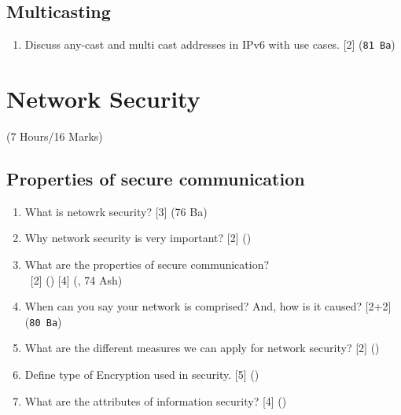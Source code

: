 \documentclass[12pt]{article}
\newcommand{\enter}{\\\textcolor{white}{1}}
\begin{document}
	\subsection{Multicasting}
		\begin{enumerate}[noitemsep, topsep=0pt]
			\item Discuss any-cast and multi cast addresses in IPv6 with use cases. \hfill [2] (\texttt{81 Ba})
		\end{enumerate}

	\pagebreak

\section{Network Security}
	\begin{center}(7 Hours/16 Marks)\end{center}
	\subsection{Properties of secure communication}
		\begin{enumerate}[noitemsep, topsep=0pt]
			\item What is netowrk security? \hfill [3] (76 Ba)

			\item Why network security is very important? \hfill [2] ()
			
			\item What are the properties of secure communication?
			\enter\hfill [2] () [4] (, 74 Ash)

			\item When can you say your network is comprised? And, how is it caused? \hfill [2+2] (\texttt{80 Ba})

			\item What are the different measures we can apply for network security? \hfill [2] ()

			\item Define type of Encryption used in security. \hfill [5] ()

			\item What are the attributes of information security? \hfill [4] ()
		\end{enumerate}
\end{document}
